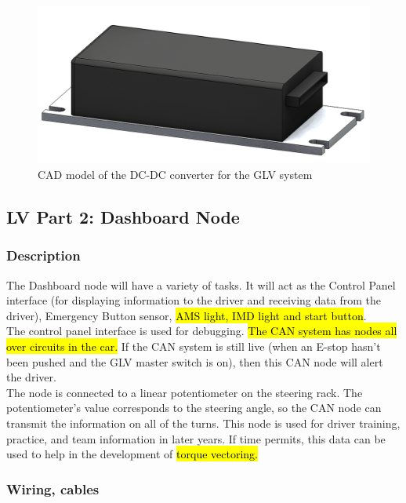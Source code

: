 \documentclass{article}
\DeclareRobustCommand{\hlr}[1]{{\sethlcolor{red}\hl{#1}}}
\begin{document}
            \begin{figure}[H]
                \centering
                \includegraphics[width = 0.5 \textwidth]{GLV_DCDC}
                \caption{CAD model of the DC-DC converter for the GLV system}
                \label{dcdc_cad}
            \end{figure}

    \subsection{LV Part 2: Dashboard Node}

        \subsubsection{Description}

            The Dashboard node will have a variety of tasks. It will act as the Control Panel interface (for displaying information to the driver and receiving data from the driver), Emergency Button sensor, \hlr{AMS light, IMD light and start button}.\\

            The control panel interface is used for debugging. \hlr{The CAN system has nodes all over circuits in the car.} If the CAN system is still live (when an E-stop hasn't been pushed and the GLV master switch is on), then this CAN node will alert the driver.\\

            The node is connected to a linear potentiometer on the steering rack. The potentiometer's value corresponds to the steering angle, so the CAN node can transmit the information on all of the turns. This node is used for driver training, practice, and team information in later years. If time permits, this data can be used to help in the development of \hlr{torque vectoring.}\\

        \subsubsection{Wiring, cables}
\end{document}
